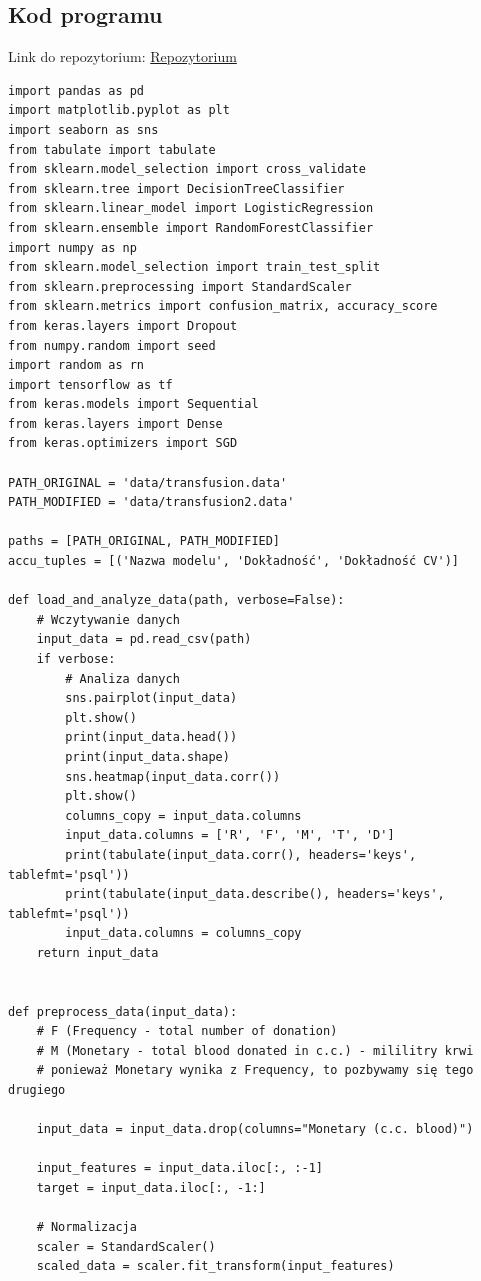 \documentclass[11pt, a4paper, notitlepage]{report}
\begin{document}
\begin{appendices}
\chapter{Kod programu}

Link do repozytorium: \href{https://github.com/ravkr/kwd-blood/}{Repozytorium}
\begin{verbatim}
import pandas as pd
import matplotlib.pyplot as plt
import seaborn as sns
from tabulate import tabulate
from sklearn.model_selection import cross_validate
from sklearn.tree import DecisionTreeClassifier
from sklearn.linear_model import LogisticRegression
from sklearn.ensemble import RandomForestClassifier
import numpy as np
from sklearn.model_selection import train_test_split
from sklearn.preprocessing import StandardScaler
from sklearn.metrics import confusion_matrix, accuracy_score
from keras.layers import Dropout
from numpy.random import seed
import random as rn
import tensorflow as tf
from keras.models import Sequential
from keras.layers import Dense
from keras.optimizers import SGD

PATH_ORIGINAL = 'data/transfusion.data'
PATH_MODIFIED = 'data/transfusion2.data'

paths = [PATH_ORIGINAL, PATH_MODIFIED]
accu_tuples = [('Nazwa modelu', 'Dokładność', 'Dokładność CV')]

def load_and_analyze_data(path, verbose=False):
    # Wczytywanie danych
    input_data = pd.read_csv(path)
    if verbose:
        # Analiza danych
        sns.pairplot(input_data)
        plt.show()
        print(input_data.head())
        print(input_data.shape)
        sns.heatmap(input_data.corr())
        plt.show()
        columns_copy = input_data.columns
        input_data.columns = ['R', 'F', 'M', 'T', 'D']
        print(tabulate(input_data.corr(), headers='keys', tablefmt='psql'))
        print(tabulate(input_data.describe(), headers='keys', tablefmt='psql'))
        input_data.columns = columns_copy
    return input_data


def preprocess_data(input_data):
    # F (Frequency - total number of donation)
    # M (Monetary - total blood donated in c.c.) - mililitry krwi
    # ponieważ Monetary wynika z Frequency, to pozbywamy się tego drugiego

    input_data = input_data.drop(columns="Monetary (c.c. blood)")

    input_features = input_data.iloc[:, :-1]
    target = input_data.iloc[:, -1:]

    # Normalizacja
    scaler = StandardScaler()
    scaled_data = scaler.fit_transform(input_features)


\end{verbatim}
\end{appendices}
\end{document}
